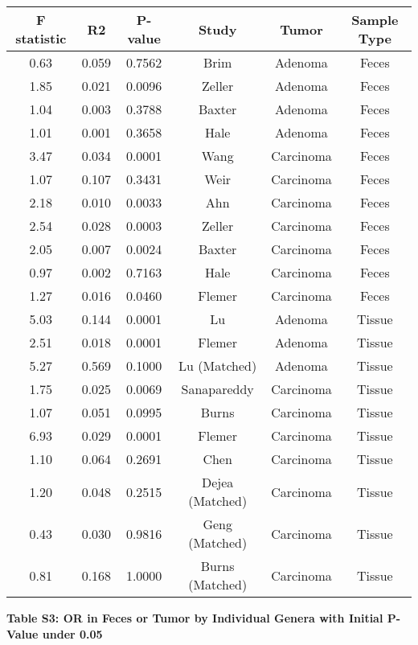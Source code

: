 \documentclass[12pt,]{article}
\begin{document}
\begin{longtable}[]{@{}cccccc@{}}
\toprule
F statistic & R2 & P-value & Study & Tumor & Sample Type\tabularnewline
\midrule
\endhead
0.63 & 0.059 & 0.7562 & Brim & Adenoma & Feces\tabularnewline
1.85 & 0.021 & 0.0096 & Zeller & Adenoma & Feces\tabularnewline
1.04 & 0.003 & 0.3788 & Baxter & Adenoma & Feces\tabularnewline
1.01 & 0.001 & 0.3658 & Hale & Adenoma & Feces\tabularnewline
3.47 & 0.034 & 0.0001 & Wang & Carcinoma & Feces\tabularnewline
1.07 & 0.107 & 0.3431 & Weir & Carcinoma & Feces\tabularnewline
2.18 & 0.010 & 0.0033 & Ahn & Carcinoma & Feces\tabularnewline
2.54 & 0.028 & 0.0003 & Zeller & Carcinoma & Feces\tabularnewline
2.05 & 0.007 & 0.0024 & Baxter & Carcinoma & Feces\tabularnewline
0.97 & 0.002 & 0.7163 & Hale & Carcinoma & Feces\tabularnewline
1.27 & 0.016 & 0.0460 & Flemer & Carcinoma & Feces\tabularnewline
5.03 & 0.144 & 0.0001 & Lu & Adenoma & Tissue\tabularnewline
2.51 & 0.018 & 0.0001 & Flemer & Adenoma & Tissue\tabularnewline
5.27 & 0.569 & 0.1000 & Lu (Matched) & Adenoma & Tissue\tabularnewline
1.75 & 0.025 & 0.0069 & Sanapareddy & Carcinoma & Tissue\tabularnewline
1.07 & 0.051 & 0.0995 & Burns & Carcinoma & Tissue\tabularnewline
6.93 & 0.029 & 0.0001 & Flemer & Carcinoma & Tissue\tabularnewline
1.10 & 0.064 & 0.2691 & Chen & Carcinoma & Tissue\tabularnewline
1.20 & 0.048 & 0.2515 & Dejea (Matched) & Carcinoma &
Tissue\tabularnewline
0.43 & 0.030 & 0.9816 & Geng (Matched) & Carcinoma &
Tissue\tabularnewline
0.81 & 0.168 & 1.0000 & Burns (Matched) & Carcinoma &
Tissue\tabularnewline
\bottomrule
\end{longtable}

\newpage

\textbf{Table S3: OR in Feces or Tumor by Individual Genera with Initial
P-Value under 0.05}

\footnotesize
\end{document}
